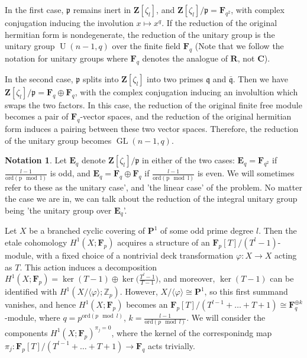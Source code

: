 \documentclass{article}
\theoremstyle{definition}
\newtheorem*{notation}{Notation}
\DeclareMathOperator{\GL}{\mathrm{GL}}
\DeclareMathOperator{\U}{\mathrm{U}}
\DeclareMathOperator{\et}{\mathrm{\acute{e}t}}
\begin{document}
	In the first case, $\mathfrak{p}$ remains inert in $\mathbf{Z}[\zeta_l]$, and $\mathbf{Z}[\zeta_l]/\mathfrak{p} = \mathbf{F}_{q^2}$, with complex conjugation inducing the involution $x \mapsto x^q$. If the reduction of the original hermitian form is nondegenerate, the reduction of the unitary group is the unitary group $\U(n-1,q)$ over the finite field $\mathbf{F}_q$ (Note that we follow the notation for unitary groups where $\mathbf{F}_q$ denotes the analogue of $\mathbf{R}$, not $\mathbf{C}$). \par
	In the second case, $\mathfrak{p}$ splits into $\mathbf{Z}[\zeta_l]$ into two primes $\mathfrak{q}$ and $\bar{\mathfrak{q}}$. Then we have $\mathbf{Z}[\zeta_l]/\mathfrak{p} = \mathbf{F}_q \oplus \mathbf{F}_q$, with the complex conjugation inducing an involultion which swaps the two factors. In this case, the reduction of the original finite free module becomes a pair of $\mathbf{F}_q$-vector spaces, and the reduction of the original hermitian form induces a pairing between these two vector spaces. Therefore, the reduction of the unitary group becomes $\GL(n-1,q)$.
	\begin{notation}
		Let $\mathbf{E}_q$ denote $\mathbf{Z}[\zeta_l]/\mathfrak{p}$ in either of the two cases: $\mathbf{E}_q=\mathbf{F}_{q^2}$ if $\frac{l-1}{\mathrm{ord (p \mod l)}}$ is odd, and $\mathbf{E}_q = \mathbf{F}_q \oplus \mathbf{F}_q$ if $\frac{l-1}{\mathrm{ord (p \mod l)}}$ is even. We will sometimes refer to these as 
		the unitary case', and 'the linear case' of the problem. No matter the case we are in, we can talk about the reduction of the integral unitary group being 'the unitary group over $\mathbf{E}_q$'.
	\end{notation}
	Let $X$ be a branched cyclic covering of $\mathbf{P}^1$ of some odd prime degree $l$. Then the etale cohomology $H^1_{\et}(X;\mathbf{F}_p)$ acquires a structure of an $\mathbf{F}_p[T]/(T^l - 1)$-module, with a fixed choice of a nontrivial deck transformation $\varphi : X \to X$ acting as $T$. This action induces a decomposition $H^1_{\et}(X; \mathbf{F}_p) = \ker (T-1) \oplus \ker \Big( \frac{T^l-1}{T-1} \Big)$, and moreover, $\ker(T-1)$ can be identified with $H^1_{\et}(X/\langle \varphi \rangle;\mathbb{Z}_p)$. However, $X / \langle \varphi \rangle \cong \mathbf{P}^1$, so this first summand vanishes, and hence $H^1_{\et}(X; \mathbf{F}_p)$ becomes an $\mathbf{F}_p[T] / (T^{l-1} + \ldots + T + 1) \cong \mathbf{F}_q^{\oplus k}$-module, where $q = p^{\mathrm{ord} (p \mod l)}$, $k = \frac{l-1}{\mathrm{ord} (p \mod l)}$. We will consider the components $H^1_{\et}(X; \mathbf{F}_p)^{\pi_j = 0}$, where the kernel of the corresponindg map $\pi_j : \mathbf{F}_p[T] / (T^{l-1} + \ldots + T + 1) \to \mathbf{F}_q$ acts trivially. \par  
\end{document}
